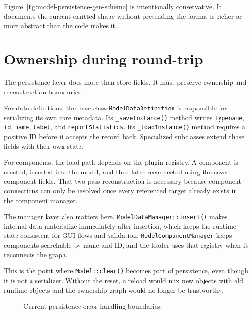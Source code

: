Figure~\ref{fig:model-persistence-gen-schema} is intentionally conservative.
It documents the current emitted shape without pretending the format is richer
or more abstract than the code makes it.

\section{Ownership during round-trip}
\label{sec:model-persistence-ownership}

The persistence layer does more than store fields. It must preserve ownership
and reconstruction boundaries.

For data definitions, the base class \texttt{ModelDataDefinition} is
responsible for serializing its own core metadata. Its \texttt{\_saveInstance()}
method writes \texttt{typename}, \texttt{id}, \texttt{name}, \texttt{label},
and \texttt{reportStatistics}. Its \texttt{\_loadInstance()} method requires a
positive ID before it accepts the record back. Specialized subclasses extend
those fields with their own state.

For components, the load path depends on the plugin registry. A component is
created, inserted into the model, and then later reconnected using the saved
component fields. That two-pass reconstruction is necessary because component
connections can only be resolved once every referenced target already exists in
the component manager.

The manager layer also matters here. \texttt{ModelDataManager::insert()} makes
internal data materialize immediately after insertion, which keeps the runtime
state consistent for GUI flows and validation. \texttt{ModelComponentManager}
keeps components searchable by name and ID, and the loader uses that registry
when it reconnects the graph.

This is the point where \texttt{Model::clear()} becomes part of persistence,
even though it is not a serializer. Without the reset, a reload would mix new
objects with old runtime objects and the ownership graph would no longer be
trustworthy.

\begin{figure}[htbp]
\centering
\caption{Current persistence error-handling boundaries.}
\label{fig:model-persistence-error-handling}
\end{figure}

